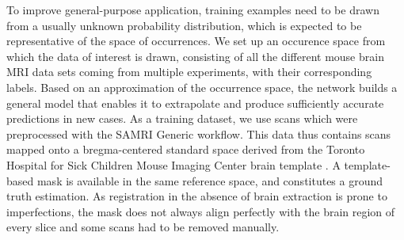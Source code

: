 To improve general-purpose application, training examples need to be drawn from a usually unknown probability distribution, which is expected to be representative of the space of occurrences.
We set up an occurence space from which the data of interest is drawn, consisting of all the different mouse brain MRI data sets coming from multiple experiments, with their corresponding labels.
Based on an approximation of the occurrence space, the network builds a general model that enables it to extrapolate and produce sufficiently accurate predictions in new cases.
As a training dataset, we use scans which were preprocessed with the SAMRI Generic workflow.
This data thus contains scans mapped onto a bregma-centered standard \cite{ioanas_optimized_2019} space derived from the Toronto Hospital for Sick Children Mouse Imaging Center brain template \cite{dsu}.
A template-based mask is available in the same reference space, and constitutes a ground truth estimation.
As registration in the absence of brain extraction is prone to imperfections, the mask does not always align perfectly with the brain region of every slice and some scans had to be removed manually.